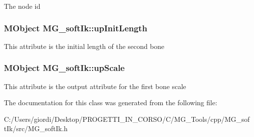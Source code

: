 The node id \hypertarget{class_m_g__soft_ik_a77928e84cd0a9004779b0c180082efe9}{
\subsubsection[{up\-Init\-Length}]{\setlength{\rightskip}{0pt plus 5cm}M\-Object M\-G\-\_\-soft\-Ik\-::up\-Init\-Length\hspace{0.3cm}{\ttfamily [static]}}}\label{class_m_g__soft_ik_a77928e84cd0a9004779b0c180082efe9}
This attribute is the initial length of the second bone \hypertarget{class_m_g__soft_ik_a756bb616c77c3f8e43ede9b9e6cb5640}{
\subsubsection[{up\-Scale}]{\setlength{\rightskip}{0pt plus 5cm}M\-Object M\-G\-\_\-soft\-Ik\-::up\-Scale\hspace{0.3cm}{\ttfamily [static]}}}\label{class_m_g__soft_ik_a756bb616c77c3f8e43ede9b9e6cb5640}
This attribute is the output attribute for the first bone scale 

The documentation for this class was generated from the following file\-:\begin{DoxyCompactItemize}
\item 
C\-:/\-Users/giordi/\-Desktop/\-P\-R\-O\-G\-E\-T\-T\-I\-\_\-\-I\-N\-\_\-\-C\-O\-R\-S\-O/\-C/\-M\-G\-\_\-\-Tools/cpp/\-M\-G\-\_\-soft\-Ik/src/M\-G\-\_\-soft\-Ik.\-h\end{DoxyCompactItemize}
